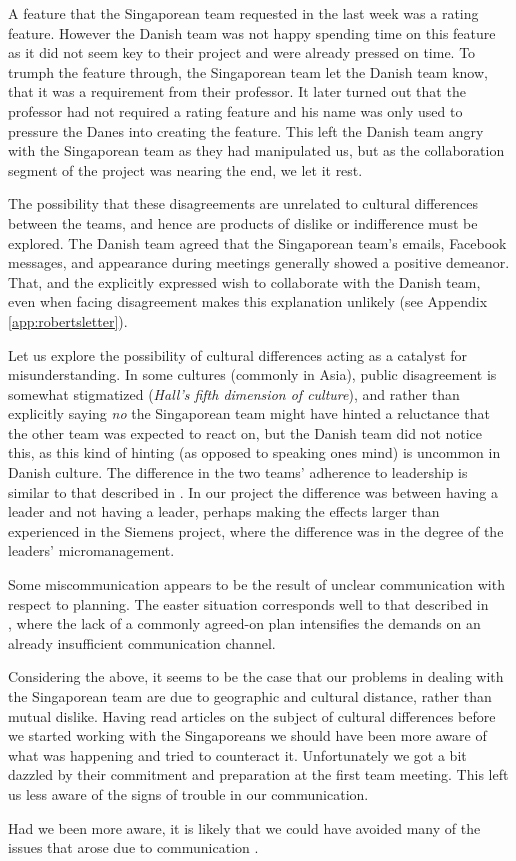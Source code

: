 A feature that the Singaporean team requested in the last week was
a rating feature. However the Danish team was not happy spending time on this
feature as it did not seem key to their project and were already pressed on 
time. To trumph the feature through, the Singaporean team let the Danish team know,
that it was a requirement from their professor. It later turned out that the
professor had not required a rating feature and his name was only used
to pressure the Danes into creating the feature. This left the Danish team angry with the 
Singaporean team as they had manipulated us, but as the collaboration
segment of the project was nearing the end, we let it rest.

The possibility that these disagreements are unrelated to cultural differences
between the teams, and hence are products of dislike or indifference must be
explored. The Danish team agreed that the Singaporean team's emails, Facebook
messages, and appearance during meetings generally showed a positive demeanor.
That, and the explicitly expressed wish to collaborate with the Danish team,
even when facing disagreement makes this explanation unlikely (see Appendix
\ref{app:robertsletter}).

Let us explore the possibility of cultural differences acting as a catalyst for
misunderstanding. In some cultures (commonly in Asia), public disagreement is somewhat
stigmatized (\emph{Hall's fifth dimension of
culture})\cite{surprises}\cite{herbsiemens}, and rather than explicitly saying
\emph{no} the Singaporean team might have hinted a reluctance that the other
team was expected to react on, but the Danish team did not notice this, as this
kind of hinting (as opposed to speaking ones mind) is uncommon in Danish
culture. The difference in the two teams' adherence to leadership is similar to
that described in \cite{herbsiemens}. In our project the difference was between
having a leader and not having a leader, perhaps making the effects larger than
experienced in the Siemens project, where the difference was in the degree of
the leaders' micromanagement.

Some miscommunication appears to be the result of unclear communication with
respect to planning. The easter situation corresponds well to that described in
\\ \cite[sec.~3.1.2]{herbsiemens}, where the lack of a commonly agreed-on plan
intensifies the demands on an already insufficient communication channel.

Considering the above, it seems to be the case that our problems in dealing
with the Singaporean team are due to geographic and cultural distance, rather
than mutual dislike. Having read articles on the subject of cultural
differences before we started working with the Singaporeans we should have been
more aware of what was happening and tried to counteract it. Unfortunately we
got a bit dazzled by their commitment and preparation at the first team meeting.
This left us less aware of the signs of trouble in our communication. 

Had we been more aware, it is likely that we could have avoided many of the
 issues that arose due to communication .
